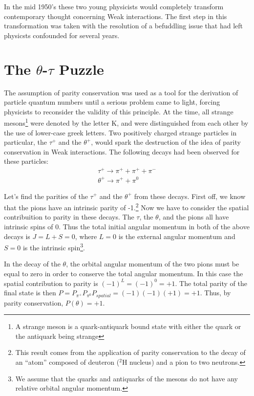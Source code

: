 \documentclass[a4paper,12pt]{book}
\begin{document}
In the mid 1950's these two young physicists would completely transform contemporary thought concerning Weak interactions. The first step in this transformation was taken with the resolution of a befuddling issue that had left physicsts confounded for several years. 

\section{The $\theta$-$\tau$ Puzzle}

The assumption of parity conservation was used as a tool for the derivation of particle quantum numbers  until a serious problem came to light, forcing physicists to reconsider the validity of this principle. At the time, all strange mesons\footnote{A strange meson is a quark-antiquark bound state with either the quark or the antiquark being strange} were denoted by the letter K, and were distinguished from each other by the use of lower-case greek letters\cite{brandt}. Two positively charged strange particles in particular, the $\tau^{+}$ and the $\theta^{+}$, would spark the destruction of the idea of parity conservation in Weak interactions. The following decays had been observed for these particles:
\begin{gather}
 \tau^{+} \longrightarrow \pi^{+}+\pi^{+}+\pi^{-} \\
 \theta^{+} \longrightarrow \pi^{+}+\pi^{0}
\end{gather}

Let's find the parities of the $\tau^{+}$ and the $\theta^{+}$ from these decays. First off, we know that the pions have an intrinsic parity of -1.\footnote{This result comes from the application of parity conservation to the decay of an ``atom'' composed of deuteron ($^{2}$H nucleus) and a pion to two neutrons.} Now we have to consider the spatial contribuition to parity in these decays. The $\tau$, the $\theta$, and the pions all have intrinsic spins of 0. Thus the total initial angular momentum in both of the above decays is $J=L+S=0$, where $L=0$ is the external angular momentum and $S=0$ is the intrinsic spin\footnote{We assume that the quarks and antiquarks of the mesons do not have any relative orbital angular momentum\cite{povh}.}.

In the decay of the $\theta$, the orbital angular momentum of the two pions must be equal to zero in order to conserve the total angular momentum. In this case the spatial contribution to parity is $(-1)^{L}=(-1)^{0}=+1$. The total parity of the final state is then $P=P_{\pi^{+}}P_{\pi^{0}}P_{spatial}=(-1)(-1)(+1)=+1$. Thus, by parity conservation, $P(\theta)=+1$.
\end{document}

